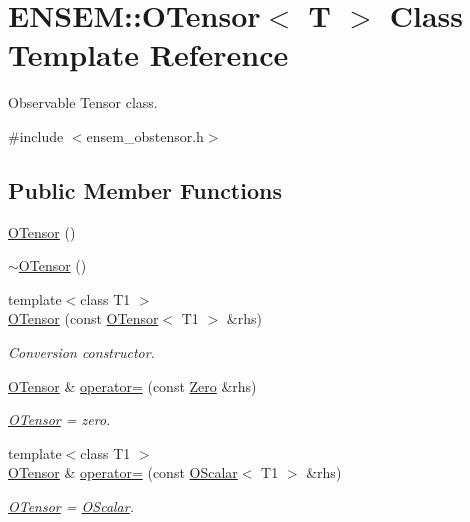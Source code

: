 \hypertarget{classENSEM_1_1OTensor}{}\section{E\+N\+S\+EM\+:\+:O\+Tensor$<$ T $>$ Class Template Reference}
\label{classENSEM_1_1OTensor}


Observable Tensor class.  




{\ttfamily \#include $<$ensem\+\_\+obstensor.\+h$>$}

\subsection*{Public Member Functions}
\begin{DoxyCompactItemize}
\item 
\mbox{\hyperlink{classENSEM_1_1OTensor_a514d20086c92e7b19386708978d34483}{O\+Tensor}} ()
\item 
\mbox{\hyperlink{classENSEM_1_1OTensor_a7be6a7cdba7403be29ede1f21ee706f7}{$\sim$\+O\+Tensor}} ()
\item 
{\footnotesize template$<$class T1 $>$ }\\\mbox{\hyperlink{classENSEM_1_1OTensor_a49dbc01d4f79e52900b10dd220cdc546}{O\+Tensor}} (const \mbox{\hyperlink{classENSEM_1_1OTensor}{O\+Tensor}}$<$ T1 $>$ \&rhs)
\begin{DoxyCompactList}\small\item\em Conversion constructor. \end{DoxyCompactList}\item 
\mbox{\hyperlink{classENSEM_1_1OTensor}{O\+Tensor}} \& \mbox{\hyperlink{classENSEM_1_1OTensor_aae562552ce915d3d39c65dfe463fa50a}{operator=}} (const \mbox{\hyperlink{structENSEM_1_1Zero}{Zero}} \&rhs)
\begin{DoxyCompactList}\small\item\em \mbox{\hyperlink{classENSEM_1_1OTensor}{O\+Tensor}} = zero. \end{DoxyCompactList}\item 
{\footnotesize template$<$class T1 $>$ }\\\mbox{\hyperlink{classENSEM_1_1OTensor}{O\+Tensor}} \& \mbox{\hyperlink{classENSEM_1_1OTensor_ae763ca68be1d6b8d5b27b8d544ab5f2d}{operator=}} (const \mbox{\hyperlink{classENSEM_1_1OScalar}{O\+Scalar}}$<$ T1 $>$ \&rhs)
\begin{DoxyCompactList}\small\item\em \mbox{\hyperlink{classENSEM_1_1OTensor}{O\+Tensor}} = \mbox{\hyperlink{classENSEM_1_1OScalar}{O\+Scalar}}. \end{DoxyCompactList}\item 

\end{DoxyCompactItemize}
